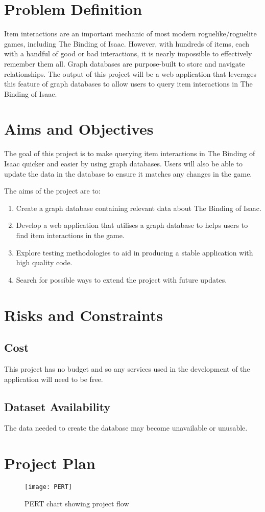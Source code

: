 \section{Problem Definition}
Item interactions are an important mechanic of most modern roguelike/roguelite games, including The Binding of Isaac. 
However, with hundreds of items, each with a handful of good or bad interactions, it is nearly impossible to effectively
 remember them all. Graph databases are purpose-built to store and navigate relationships.\cite{WhatGraphDatabase} 
The output of this project will be a web application that leverages this feature of graph databases to allow users to 
query item interactions in The Binding of Isaac.
\section{Aims and Objectives}
The goal of this project is to make querying item interactions in The Binding of Isaac quicker and easier by using graph
 databases. Users will also be able to update the data in the database to ensure it matches any changes in the game.\par
The aims of the project are to:
\begin{enumerate}
    \item Create a graph database containing relevant data about The Binding of Isaac.
    \item Develop a web application that utilises a graph database to helps users to find item interactions in the game.
    \item Explore testing methodologies to aid in producing a stable application with high quality code.
    \item Search for possible ways to extend the project with future updates.
\end{enumerate}
\section{Risks and Constraints}
\subsection*{Cost}
This project has no budget and so any services used in the development of the application will need to be free.
\subsection*{Dataset Availability}
The data needed to create the database may become unavailable or unusable.
\section{Project Plan}
\begin{figure}[h]
    \caption{PERT chart showing project flow}
    \centering
    \texttt{[image: PERT]}
\end{figure}